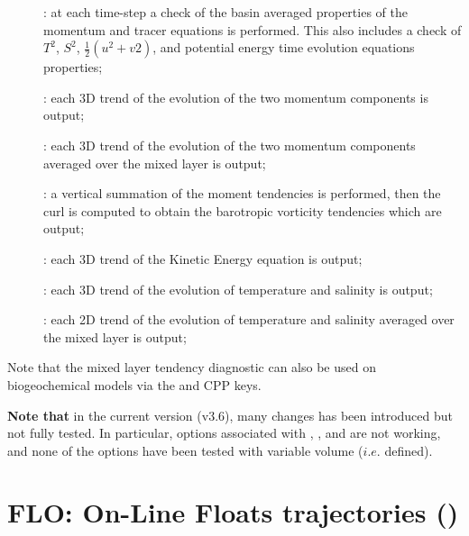 \documentclass[../tex_main/NEMO_manual]{subfiles}
\begin{document}
\begin{description}
\item[]:
  at each  time-step a check of the basin averaged properties of
  the momentum and tracer equations is performed.
  This also includes a check of $T^2$, $S^2$, $\tfrac{1}{2} (u^2+v2)$,
  and potential energy time evolution equations properties;
\item[]:
  each 3D trend of the evolution of the two momentum components is output;
\item[]:
  each 3D trend of the evolution of the two momentum components averaged over the mixed layer is output;
\item[]:
  a vertical summation of the moment tendencies is performed,
  then the curl is computed to obtain the barotropic vorticity tendencies which are output;
\item[] :
  each 3D trend of the Kinetic Energy equation is output;
\item[]:
  each 3D trend of the evolution of temperature and salinity is output;
\item[]:
  each 2D trend of the evolution of temperature and salinity averaged over the mixed layer is output;
\end{description}

Note that the mixed layer tendency diagnostic can also be used on biogeochemical models via 
the  and  CPP keys.

\textbf{Note that} in the current version (v3.6), many changes has been introduced but not fully tested.
In particular, options associated with , , and  are not working,
and none of the options have been tested with variable volume ($i.e.$  defined).

\section{FLO: On-Line Floats trajectories (\protect{})}
\label{sec:FLO}
\end{document}

